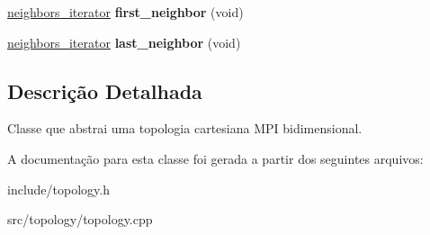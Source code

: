 \begin{DoxyCompactItemize}
\item 
\hypertarget{classTopology_a25656f686f011250380f9122d0065cc5}{
\hyperlink{classneighbors__iterator}{neighbors\_\-iterator} {\bfseries first\_\-neighbor} (void)}
\label{classTopology_a25656f686f011250380f9122d0065cc5}

\item 
\hypertarget{classTopology_a83cada2ba567209dc30995895ee3ba94}{
\hyperlink{classneighbors__iterator}{neighbors\_\-iterator} {\bfseries last\_\-neighbor} (void)}
\label{classTopology_a83cada2ba567209dc30995895ee3ba94}

\end{DoxyCompactItemize}


\subsection{Descrição Detalhada}
Classe que abstrai uma topologia cartesiana MPI bidimensional. 

A documentação para esta classe foi gerada a partir dos seguintes arquivos:\begin{DoxyCompactItemize}
\item 
include/topology.h\item 
src/topology/topology.cpp\end{DoxyCompactItemize}

